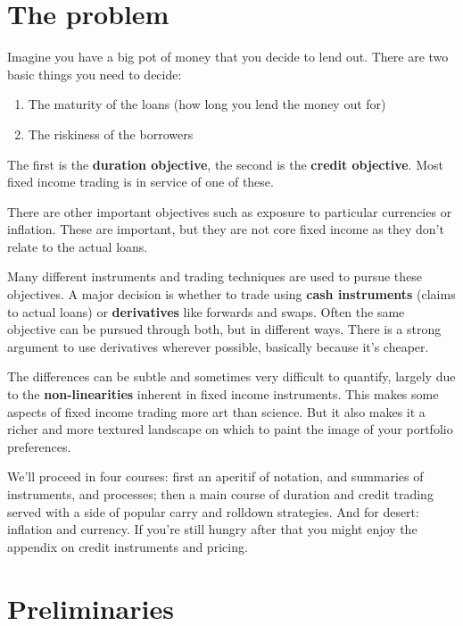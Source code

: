 

\section{The problem}

Imagine you have a big pot of money that you decide to lend out. There are two basic things you need to decide:

\begin{enumerate}
\item The maturity of the loans (how long you lend the money out for)
\item The riskiness of the borrowers
\end{enumerate}

The first is the \textbf{duration objective}, the second is the \textbf{credit objective}. Most  fixed income trading is in service of one of these. 

There are other important objectives such as exposure to particular currencies or inflation. These are important, but they are not core fixed income as they don't relate to the actual loans. 

Many different instruments and trading techniques are used to pursue these objectives. A major decision is whether to trade using \textbf{cash instruments} (claims to actual loans) or \textbf{derivatives} like forwards and swaps. Often the same objective can be pursued through both, but in different ways. There is a strong argument to use derivatives wherever possible, basically because it's cheaper.

The differences can be subtle and sometimes very difficult to quantify, largely due to the \textbf{non-linearities} inherent in fixed income instruments. This makes some aspects of fixed income trading more art than science. But it also makes it a richer and more textured landscape on which to paint the image of your portfolio preferences.

We'll proceed in four courses: first an aperitif of notation, and summaries of instruments, and processes; then a main course of duration and credit trading served with a side of popular carry and rolldown strategies. And for desert: inflation and currency.  If you're still hungry after that you might enjoy the appendix on credit instruments and pricing.


\section{Preliminaries}

